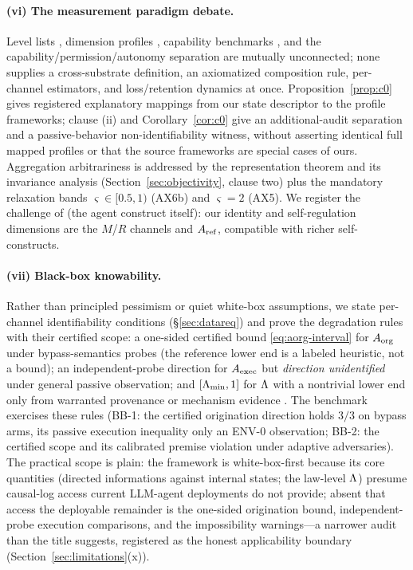 \paragraph{(vi) The measurement paradigm debate.} Level lists
\citep{feng2025}, dimension profiles \citep{kasirzadeh2025,dung2024}, capability
benchmarks \citep{liu2023,kapoor2024}, and the capability/permission/autonomy
separation \citep{capability_permission2026} are mutually unconnected; none
supplies a cross-substrate definition, an axiomatized composition rule,
per-channel estimators, and loss/retention dynamics at once.
Proposition~\ref{prop:c0} gives registered explanatory mappings from our state
descriptor to the profile frameworks; clause (ii) and Corollary~\ref{cor:c0}
give an additional-audit separation and a passive-behavior non-identifiability
witness, without asserting identical full mapped profiles or that the source
frameworks are special cases of ours. Aggregation arbitrariness is addressed by
the representation theorem and its invariance analysis
(Section~\ref{sec:objectivity}, clause two) plus the mandatory relaxation bands
$\varsigma\in[0.5,1)$ (AX6b) and $\varsigma=2$ (AX5). We register the challenge
of \citet{xing2026} (the agent construct itself): our identity and
self-regulation dimensions are the $M$/$R$ channels and $A_{\mathrm{ref}}$, compatible with
richer self-constructs.

\paragraph{(vii) Black-box knowability.} Rather than principled pessimism or
quiet white-box assumptions, we state per-channel identifiability conditions
(\S\ref{sec:datareq}) and prove the degradation rules with their certified
scope: a one-sided certified bound \eqref{eq:aorg-interval} for $A_{\mathrm{org}}$ under
bypass-semantics probes (the reference lower end is a labeled heuristic, not a
bound); an independent-probe direction for $A_{\mathrm{exec}}$ but \emph{direction
unidentified} under general passive observation; and $[\Lambda_{\min},1]$ for
$\Lambda$ with a nontrivial lower end only from warranted provenance or mechanism
evidence \citep{capability_permission2026}. The benchmark exercises these rules
(BB-1: the certified origination direction holds $3/3$ on bypass arms, its
passive execution inequality only an ENV-0 observation; BB-2: the certified
scope and its calibrated premise violation under adaptive adversaries). The
practical scope is plain: the framework is white-box-first because its core
quantities (directed informations against internal states; the law-level $\Lambda$)
presume causal-log access current LLM-agent deployments do not provide; absent
that access the deployable remainder is the one-sided origination bound,
independent-probe execution comparisons, and the impossibility warnings---a
narrower audit than the title suggests, registered as the honest applicability
boundary (Section~\ref{sec:limitations}(x)).

